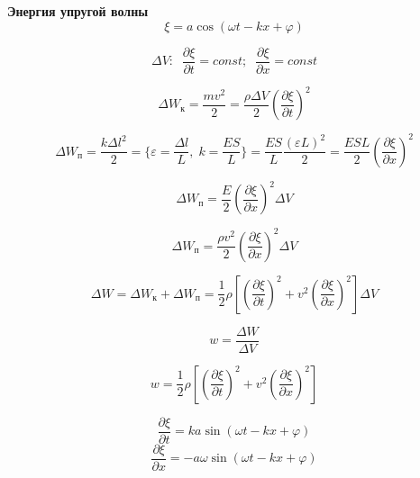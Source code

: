 \documentclass{article}
\begin{document}
	
	\textbf{Энергия упругой волны}\\

	\begin{equation}
		\xi = a\cos(\omega t - kx + \varphi)
	\end{equation}

	\begin{equation}
		\Delta V:\;\;\frac{\partial\xi}{\partial t} = const;\;\;\frac{\partial\xi}{\partial x} = const
	\end{equation}

	\begin{equation}
		\Delta W_\text{к} = \frac{mv^2}{2} = \frac{\rho\Delta V}{2}(\frac{\partial\xi}{\partial t})^2
	\end{equation}

	\begin{equation}
		\Delta W_\text{п} = \frac{k\Delta l^2}{2} = \{\varepsilon=\frac{\Delta l}{L},\;k=\frac{ES}{L}\} = \frac{ES}{L}\frac{(\varepsilon L)^2}{2}=\frac{ESL}{2}(\frac{\partial\xi}{\partial x})^2
	\end{equation}

	\begin{equation}
		\Delta W_\text{п} = \frac{E}{2}(\frac{\partial\xi}{\partial x})^2\Delta V
	\end{equation}

	\begin{equation}
		\Delta W_\text{п}=\frac{\rho v^2}{2}(\frac{\partial\xi}{\partial x})^2 \Delta V
	\end{equation}

	\begin{equation}
		\Delta W = \Delta W_\text{к}+\Delta W_\text{п} = \frac{1}{2}\rho[(\frac{\partial\xi}{\partial t})^2+v^2(\frac{\partial\xi}{\partial x})^2]\Delta V
	\end{equation}

	\begin{equation}
		 w=\frac{\Delta W}{\Delta V}
	\end{equation}

	\begin{equation}
		w=\frac{1}{2}\rho[(\frac{\partial\xi}{\partial t})^2+v^2(\frac{\partial\xi}{\partial x})^2]
	\end{equation}

	\begin{equation}
		\frac{\partial\xi}{\partial t} = ka\sin(\omega t - kx + \varphi)
	\end{equation}
	\begin{equation}
		\frac{\partial\xi}{\partial x} = -a\omega\sin(\omega t - kx + \varphi)
	\end{equation}
\end{document}
